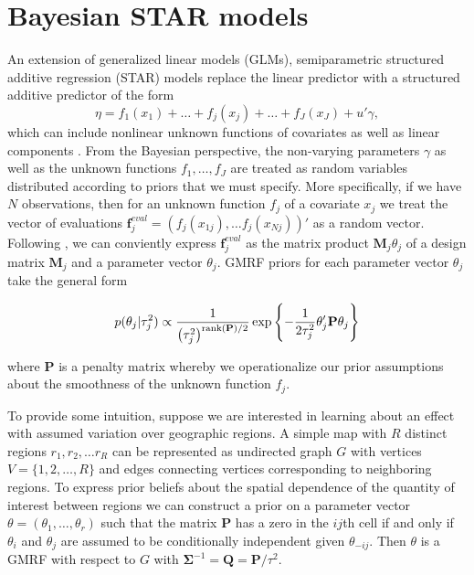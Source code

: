 \section{Bayesian STAR models}
\label{star}

An extension of generalized linear models (GLMs), semiparametric structured additive regression (STAR) models replace the linear predictor with a structured additive predictor of the form
%
\begin{equation*}
\eta = f_1(x_1) + \ldots + f_j(x_j) + \ldots + f_J(x_J) + u'\gamma,
\end{equation*}
%
\noindent which can include nonlinear unknown functions of covariates as well as linear components . From the Bayesian perspective, the non-varying parameters $\gamma$ as well as the unknown functions $f_1, \dots, f_J$ are treated as random variables distributed according to priors that we must specify. More specifically, if we have $N$ observations, then for an unknown function $f_j$ of a covariate $x_j$ we treat the vector of evaluations $\mathbf{f}_j^{eval} = \left(f_j(x_{1j}), \dots f_j(x_{Nj})\right)' $ as a random vector. Following , we can conviently express $\mathbf{f}_j^{eval}$ as the matrix product $\mathbf{M}_j \theta_j$ of a design matrix $\mathbf{M}_j$ and a parameter vector $\theta_j$. GMRF priors for each parameter vector $\theta_j$ take the general form

\begin{equation*}
p(\theta_j | \tau^2_j) 
\propto 
\frac{1}{\left(\tau^2_j\right)^{{\rm rank}(\mathbf{P})/2} }
\exp{\left\{-\frac{1}{2\tau^2_j} \theta_j' \mathbf{P} \theta_j\right\}}
\end{equation*}

\noindent where $\mathbf{P}$ is a penalty matrix whereby we operationalize our prior assumptions about the smoothness of the unknown function $f_j$. 

To provide some intuition, suppose we are interested in learning about an effect with assumed variation over geographic regions.  A simple map with $R$ distinct regions $r_1, r_2, \dots r_R$ can be represented as undirected graph $G$ with vertices $V = \{1, 2, \dots, R\}$ and edges connecting vertices corresponding to neighboring regions. To express prior beliefs about the spatial dependence of the quantity of interest between regions we can construct a prior on a parameter vector $\theta = (\theta_1, \dots, \theta_r)$ such that the matrix $\mathbf{P}$ has a zero in the $ij$th cell if and only if $\theta_i$ and $\theta_j$ are assumed to be conditionally independent given $\theta_{-ij}$. Then $\theta$ is a GMRF with respect to $G$ with $\boldsymbol{\Sigma}^{-1} = \mathbf{Q} = \mathbf{P}/\tau^2$. 

